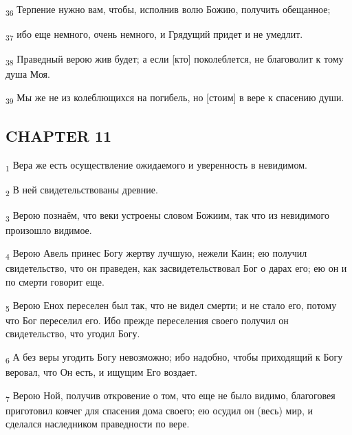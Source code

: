 \begin{tcolorbox}
\textsubscript{36} Терпение нужно вам, чтобы, исполнив волю Божию, получить обещанное;
\end{tcolorbox}
\begin{tcolorbox}
\textsubscript{37} ибо еще немного, очень немного, и Грядущий придет и не умедлит.
\end{tcolorbox}
\begin{tcolorbox}
\textsubscript{38} Праведный верою жив будет; а если [кто] поколеблется, не благоволит к тому душа Моя.
\end{tcolorbox}
\begin{tcolorbox}
\textsubscript{39} Мы же не из колеблющихся на погибель, но [стоим] в вере к спасению души.
\end{tcolorbox}
\subsection{CHAPTER 11}
\begin{tcolorbox}
\textsubscript{1} Вера же есть осуществление ожидаемого и уверенность в невидимом.
\end{tcolorbox}
\begin{tcolorbox}
\textsubscript{2} В ней свидетельствованы древние.
\end{tcolorbox}
\begin{tcolorbox}
\textsubscript{3} Верою познаём, что веки устроены словом Божиим, так что из невидимого произошло видимое.
\end{tcolorbox}
\begin{tcolorbox}
\textsubscript{4} Верою Авель принес Богу жертву лучшую, нежели Каин; ею получил свидетельство, что он праведен, как засвидетельствовал Бог о дарах его; ею он и по смерти говорит еще.
\end{tcolorbox}
\begin{tcolorbox}
\textsubscript{5} Верою Енох переселен был так, что не видел смерти; и не стало его, потому что Бог переселил его. Ибо прежде переселения своего получил он свидетельство, что угодил Богу.
\end{tcolorbox}
\begin{tcolorbox}
\textsubscript{6} А без веры угодить Богу невозможно; ибо надобно, чтобы приходящий к Богу веровал, что Он есть, и ищущим Его воздает.
\end{tcolorbox}
\begin{tcolorbox}
\textsubscript{7} Верою Ной, получив откровение о том, что еще не было видимо, благоговея приготовил ковчег для спасения дома своего; ею осудил он (весь) мир, и сделался наследником праведности по вере.
\end{tcolorbox}
